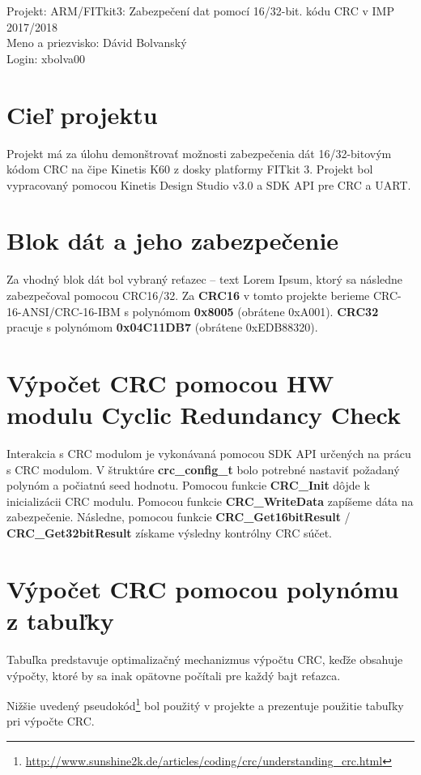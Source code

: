 \documentclass[10pt,a4paper]{article}
\author{Dávid Bolvanský}
\begin{document}
\noindent
Projekt: ARM/FITkit3: Zabezpečení dat pomocí 16/32-bit. kódu CRC v IMP 2017/2018\\
Meno a priezvisko: Dávid Bolvanský\\
Login: xbolva00

\section{Cieľ projektu}
	Projekt má za úlohu demonštrovať možnosti zabezpečenia dát 16/32-bitovým kódom CRC na čipe Kinetis K60 z dosky platformy FITkit 3. Projekt bol vypracovaný pomocou Kinetis Design Studio v3.0 a SDK API pre CRC a UART.
	
	
\section{Blok dát a jeho zabezpečenie}
	Za vhodný blok dát bol vybraný reťazec -- text Lorem Ipsum, ktorý sa následne zabezpečoval pomocou CRC16/32. Za \textbf{CRC16} v tomto projekte berieme CRC-16-ANSI/CRC-16-IBM s polynómom \textbf{0x8005} (obrátene 0xA001). \textbf{CRC32} pracuje s polynómom \textbf{0x04C11DB7} (obrátene 0xEDB88320).
	
\section{Výpočet CRC pomocou HW modulu Cyclic Redundancy Check}
	Interakcia s CRC modulom je vykonávaná pomocou SDK API určených na prácu s CRC modulom. V štruktúre \textbf{crc\_config\_t} bolo potrebné nastaviť požadaný polynóm a počiatnú seed hodnotu. Pomocou funkcie \textbf{CRC\_Init} dôjde k inicializácii CRC modulu. Pomocou funkcie \textbf{CRC\_WriteData} zapíšeme dáta na zabezpečenie. Následne, pomocou funkcie \textbf{CRC\_Get16bitResult} / \textbf{CRC\_Get32bitResult} získame výsledny kontrólny CRC súčet.
	
\section{Výpočet CRC pomocou polynómu z tabuľky}
	Tabuľka predstavuje optimalizačný mechanizmus výpočtu CRC, keďže obsahuje výpočty, ktoré by sa inak opätovne počítali pre každý bajt reťazca.
	
	Nižšie uvedený pseudokód\footnote{\url{http://www.sunshine2k.de/articles/coding/crc/understanding_crc.html}} bol použitý v projekte a prezentuje použitie tabuľky pri výpočte CRC.
	
	
\end{document}
